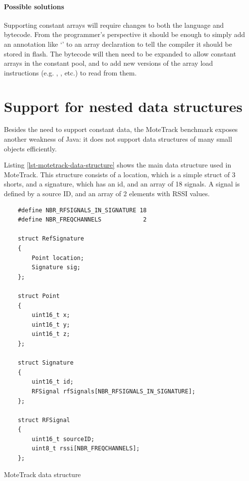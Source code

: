 \paragraph{Possible solutions}
Supporting constant arrays will require changes to both the language and bytecode. From the programmer's perspective it should be enough to simply add an annotation like `' to an array declaration to tell the compiler it should be stored in flash. The bytecode will then need to be expanded to allow constant arrays in the constant pool, and to add new versions of the array load instructions (e.g. , , etc.) to read from them.




\section{Support for nested data structures}
\label{sec-nested-data}
Besides the need to support constant data, the MoteTrack benchmark exposes another weakness of Java: it does not support data structures of many small objects efficiently.

Listing \ref{lst-motetrack-data-structure} shows the main  data structure used in MoteTrack. This structure consists of a location, which is a simple struct of 3 shorts, and a signature, which has an id, and an array of 18 signals. A signal is defined by a source ID, and an array of 2 elements with RSSI values.

\begin{listing}
\begin{verbatim}
    #define NBR_RFSIGNALS_IN_SIGNATURE 18
    #define NBR_FREQCHANNELS            2

    struct RefSignature
    {
        Point location;
        Signature sig;
    };

    struct Point
    {
        uint16_t x;
        uint16_t y;
        uint16_t z;
    };

    struct Signature
    {
        uint16_t id;
        RFSignal rfSignals[NBR_RFSIGNALS_IN_SIGNATURE];
    };

    struct RFSignal
    {
        uint16_t sourceID;
        uint8_t rssi[NBR_FREQCHANNELS];
    };
\end{verbatim}
\caption{MoteTrack  data structure}
\label{lst-motetrack-data-structure}
\end{listing}

